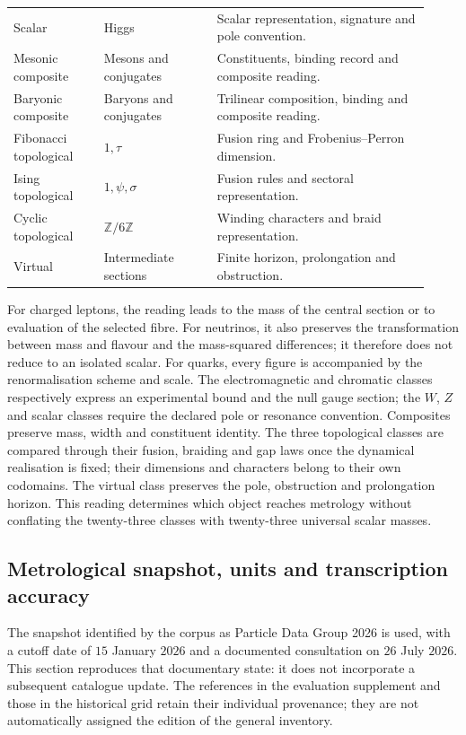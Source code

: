 \begin{table}[!htbp]
\begin{tabular}{p{0.20\linewidth}p{0.25\linewidth}p{0.47\linewidth}}
Scalar & Higgs & Scalar representation, signature and pole convention.\\
Mesonic composite & Mesons and conjugates & Constituents, binding record and composite reading.\\
Baryonic composite & Baryons and conjugates & Trilinear composition, binding and composite reading.\\
Fibonacci topological & \(1,\tau\) & Fusion ring and Frobenius--Perron dimension.\\
Ising topological & \(1,\psi,\sigma\) & Fusion rules and sectoral representation.\\
Cyclic topological & \(\mathbb Z/6\mathbb Z\) & Winding characters and braid representation.\\
Virtual & Intermediate sections & Finite horizon, prolongation and obstruction.\\
\bottomrule
\end{tabular}
\end{table}
\endgroup

For charged leptons, the reading leads to the mass of the central section
or to evaluation of the selected fibre. For neutrinos, it also preserves
the transformation between mass and flavour and the mass-squared differences; it therefore
does not reduce to an isolated scalar. For quarks, every figure is accompanied by the
renormalisation scheme and scale. The electromagnetic and
chromatic classes respectively express an experimental bound and the null gauge
section; the \(W\), \(Z\) and scalar classes require the declared pole
or resonance convention. Composites preserve mass, width and constituent
identity. The three topological classes are compared through their
fusion, braiding and gap laws once the dynamical realisation is fixed;
their dimensions and characters belong to their own codomains. The virtual
class preserves the pole, obstruction and prolongation horizon. This
reading determines which object reaches metrology without conflating the
twenty-three classes with twenty-three universal scalar masses.

\subsection{Metrological snapshot, units and transcription accuracy}
\label{subsec:vi-corte-metrologico}

The snapshot identified by the corpus as Particle Data Group
2026 is used, with a cutoff date of \(15\) January \(2026\) and a documented
consultation on \(26\) July \(2026\). This section reproduces that
documentary state: it does not incorporate a subsequent catalogue update.
The references in the evaluation supplement and those in the historical grid
retain their individual provenance; they are not automatically assigned the edition
of the general inventory.

